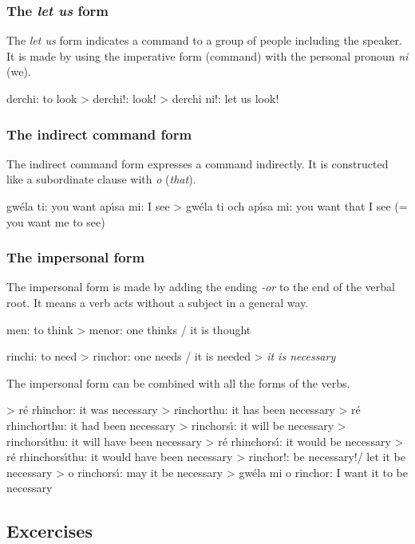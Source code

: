 \subsubsection{The \textit{let us} form}

The \textit{let us} form indicates a command to a group of people including the speaker. It is made by using the imperative form (command) with the personal pronoun \textit{ni} (we).

derchi: to look
> derchi!: look!
> derchi ni!: let us look!

\subsubsection{The indirect command form}

The indirect command form expresses a command indirectly. It is constructed like a subordinate clause with \textit{o} (\textit{that}).

gw\'{e}la ti: you want
ap\'{\i}sa mi: I see
> gw\'{e}la ti och ap\'{\i}sa mi: you want that I see (= you want me to see)

\subsubsection{The impersonal form}

The impersonal form is made by adding the ending \textit{-or} to the end of the verbal root. It means a verb acts without a subject in a general way.

men: to think
> menor: one thinks / it is thought 

rinchi: to need
> rinchor: one needs / it is needed > \textit{it is necessary}

The impersonal form can be combined with all the forms of the verbs.

> r\'{e} rhinchor: it was necessary
> rinchorthu: it has been necessary
> r\'{e} rhinchorthu: it had been necessary
> rinchors\'{\i}: it will be necessary
> rinchors\'{\i}thu: it will have been necessary
> r\'{e} rhinchors\'{\i}: it would be necessary
> r\'{e} rhinchors\'{\i}thu: it would have been necessary
> rinchor!: be necessary!/ let it be necessary
> o rinchors\'{\i}: may it be necessary
> gw\'{e}la mi o rinchor: I want it to be necessary


\subsection{Excercises}

